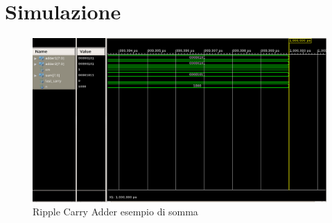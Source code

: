 %

\section{Simulazione}

\begin{figure}[H]
	\centering
\includegraphics[scale=0.5]{esercizio08/images/ripple_carry_adder_testbench.png}
	\caption{Ripple Carry Adder esempio di somma}
\end{figure}%

